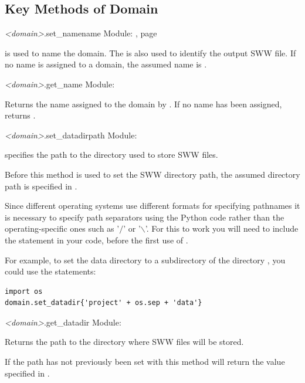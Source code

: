 \documentclass{manual}
\begin{document}
\subsection{Key Methods of Domain}

\begin{methoddesc}{\emph{<domain>}.set_name}{name}
Module: ,
page \pageref{mod:domain}

 is used to name the domain.  The  is also used to identify the output SWW file.
If no name is assigned to a domain, the assumed name is .
\end{methoddesc}

\begin{methoddesc}{\emph{<domain>}.get_name}{}
Module: 

Returns the name assigned to the domain by . If no name has been
assigned, returns .
\end{methoddesc}

\begin{methoddesc}{\emph{<domain>}.set_datadir}{path}
Module: 

 specifies the path to the directory used to store SWW files.

Before this method is used to set the SWW directory path, the assumed directory
path is  specified in .

Since different operating systems use different formats for specifying pathnames
it is necessary to specify path separators using the Python code  rather than
the operating-specific ones such as '$\slash$' or '$\backslash$'.
For this to work you will need to include the statement 
in your code, before the first use of .

For example, to set the data directory to a subdirectory
 of the directory , you could use
the statements:

\begin{verbatim}
import os
domain.set_datadir{'project' + os.sep + 'data'}
\end{verbatim}
\end{methoddesc}

\begin{methoddesc}{\emph{<domain>}.get_datadir}{}
Module: 

Returns the path to the directory where SWW files will be stored.

If the path has not previously been set with  this method
will return the value  specified in .
\end{methoddesc}
\end{document}
